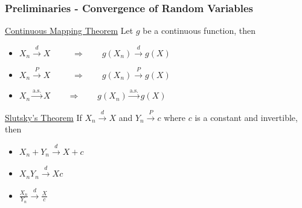 \documentclass[serif,mathserif,professionalfont]{beamer}
\begin{document}
\begin{frame}
	
	\frametitle{Preliminaries - Convergence of Random Variables}
	
	\begin{block}{\href{https://en.wikipedia.org/wiki/Continuous\_mapping\_theorem}{Continuous Mapping Theorem}}
		Let $ g $ be a continuous function, then 
		\begin{itemize}
			\item $ X_n \xrightarrow{d} X \qquad \;\; \Longrightarrow \qquad g\left(X_n \right) \xrightarrow{d} g\left(X \right) $
			\item $ X_n \xrightarrow{P} X \qquad \;\; \Longrightarrow \qquad g\left(X_n \right) \xrightarrow{P} g\left(X \right) $
			\item $ X_n \xrightarrow{\text{a.s.}} X \qquad \Longrightarrow \qquad g\left(X_n \right) \xrightarrow{\text{a.s.}} g\left(X \right) $
		\end{itemize}
	\end{block}

	\begin{block}{\href{https://en.wikipedia.org/wiki/Slutsky\%27s\_theorem}{Slutsky's Theorem}}
		If $ X_n \xrightarrow{d} X $ and $ Y_n \xrightarrow{P} c $ where $ c $ is a constant and invertible, then 
		\begin{itemize}
			\item $ X_n + Y_n \xrightarrow{d} X + c $
			\item $ X_n Y_n \xrightarrow{d} Xc $
			\item $ \frac{X_n}{Y_n} \xrightarrow{d} \frac{X}{c} $
		\end{itemize}
	\end{block}
	
\end{frame}
\end{document}

